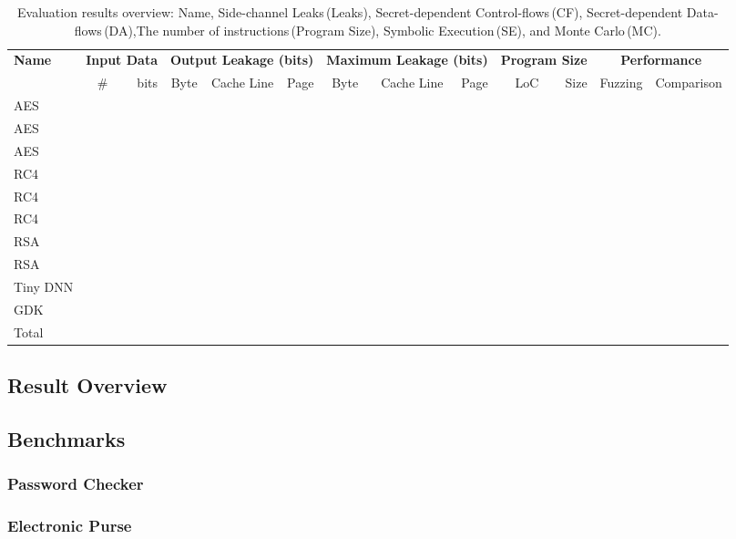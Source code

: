 \begin{table}
\footnotesize
\caption{Evaluation results overview: Name, Side-channel Leaks\,(Leaks), Secret-dependent Control-flows\,(CF), Secret-dependent Data-flows\,(DA),The number of instructions\,(Program Size), Symbolic Execution\,(SE), and Monte Carlo\,(MC).}\label{chapter5:table:over_result}
\centering
\begin{tabular}{lrrrrrrrrrrrr}\toprule

\textbf{Name}   & \multicolumn{2}{c}{\textbf{Input Data}} &  \multicolumn{3}{c}{\textbf{Output Leakage (bits)}} & \multicolumn{3}{c}{\textbf{Maximum Leakage (bits)}}   & \multicolumn{2}{c}{\textbf{Program Size}}    & \multicolumn{2}{c}{\textbf{Performance}}    \\ 
\cmidrule(lr){2-3}\cmidrule(lr){4-6}\cmidrule(lr){7-9}\cmidrule(lr){10-11}\cmidrule(lr){12-13}& \# & bits & Byte & Cache Line& Page & Byte & Cache Line& Page & LoC & Size & Fuzzing & Comparison
\\\midrule
AES       \\
AES       \\
AES \\
RC4 \\
RC4 \\
RC4 \\
RSA \\
RSA \\
Tiny DNN \\
GDK \\
Total             \\
\bottomrule
\end{tabular}


\end{table}

\subsection{Result Overview}


\subsection{Benchmarks}
\subsubsection{Password Checker}

\subsubsection{Electronic Purse}


